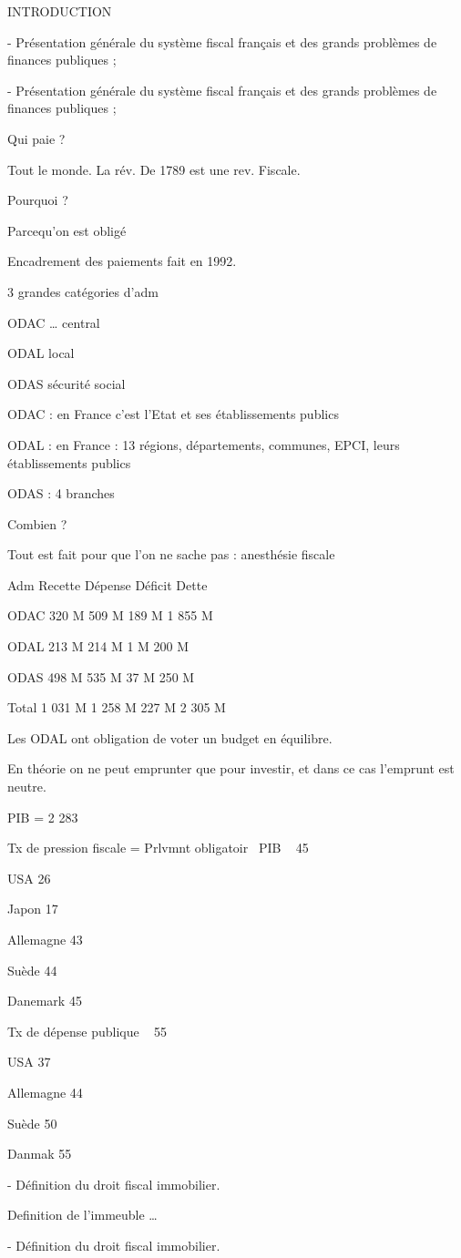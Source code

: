 INTRODUCTION

-	Présentation générale du système fiscal français et des grands problèmes de finances publiques ;

-	Présentation générale du système fiscal français et des grands problèmes de finances publiques ;


Qui paie ?


Tout le monde. La rév. De 1789 est une rev. Fiscale.


Pourquoi ?


Parcequ’on est obligé

Encadrement des paiements fait en 1992.

3 grandes catégories d’adm

ODAC … central

ODAL local

ODAS sécurité social


ODAC : en France c’est l’Etat et ses établissements publics

ODAL : en France : 13 régions, départements, communes, EPCI, leurs établissements publics

ODAS : 4 branches


Combien ?

Tout est fait pour que l’on ne sache pas : anesthésie fiscale


Adm	Recette	Dépense	Déficit	Dette

ODAC	320 M	509 M	189 M	1 855 M

ODAL	213 M	214 M	1 M	200 M

ODAS	498 M	535 M	37 M	250 M

Total	1 031 M	1 258 M	227 M	2 305 M


Les ODAL ont obligation de voter un budget en équilibre. 

En théorie on ne peut emprunter que pour investir, et dans ce cas l’emprunt est neutre. 

PIB = 2 283

Tx de pression fiscale = Prlvmnt obligatoir \ PIB ~ 45 %


USA 26 %

Japon 17 %

Allemagne 43 %

Suède 44%

Danemark 45 %


Tx de dépense publique ~ 55 %

USA 37

Allemagne 44 %

Suède 50 %

Danmak 55%


-	Définition du droit fiscal immobilier.


Definition de l’immeuble …



-	Définition du droit fiscal immobilier.
